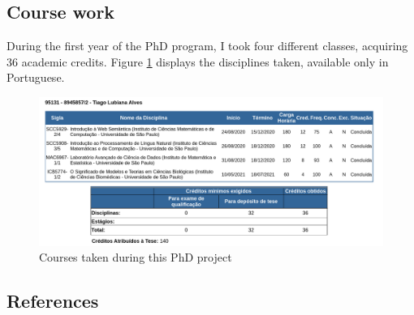 \hypertarget{course-work}{%
\subsection{Course work}\label{course-work}}

During the first year of the PhD program, I took four different classes, acquiring 36 academic credits.
Figure \ref{fig:courses_taken} displays the disciplines taken, available only in Portuguese.

\begin{figure}
\hypertarget{fig:courses_taken}{%
\centering
\includegraphics{images/janus_courses_taken.png}
\caption{Courses taken during this PhD project}\label{fig:courses_taken}
}
\end{figure}

\hypertarget{references}{%
\subsection{References}\label{references}}

